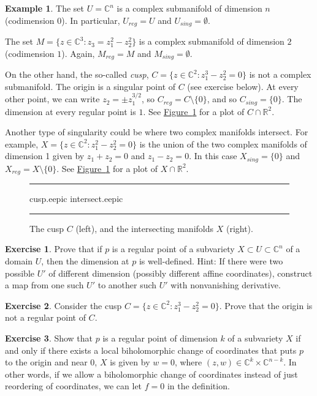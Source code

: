 \documentclass[12pt,openany]{book}
\newcommand{\C}{{\mathbb{C}}}
\newcommand{\R}{{\mathbb{R}}}
\newcommand{\myindex}[1]{#1\index{#1}}
\theoremstyle{plain}
\theoremstyle{remark}
\theoremstyle{definition}
\newenvironment{exbox}{%
    \def\FrameCommand{\vrule width 1pt \relax\hspace{10pt}}%
    \MakeFramed{\advance\hsize-\width\FrameRestore}%
}{%
    \endMakeFramed
}
\newenvironment{myfig}{%
\begin{figure}[h!t]
\noindent\rule{\textwidth}{0.5pt}\vspace{12pt}\par\centering}%
{\par\noindent\rule{\textwidth}{0.5pt}
\end{figure}}
\theoremstyle{exercise}
\newtheorem{exercise}{Exercise}[section]
\theoremstyle{example}
\newtheorem{example}[thm]{Example}
\newcommand{\figureref}[1]{\hyperref[#1]{Figure~\ref*{#1}}}
\begin{document}
\begin{example}
The set $U = \C^n$ is a complex submanifold of dimension $n$
(codimension $0$).
In particular, $U_{\mathit{reg}} = U$ and $U_{\mathit{sing}} = \emptyset$.

The set $M = \bigl\{ z \in \C^3 : z_3 = z_1^2 - z_2^2 \bigr\}$ is a complex submanifold of
dimension $2$ (codimension $1$).  Again,
$M_{\mathit{reg}} = M$ and $M_{\mathit{sing}} = \emptyset$.

On the other hand, the so-called \emph{\myindex{cusp}},
$C = \bigl\{ z \in \C^2 : z_1^3-z_2^2 = 0 \bigr\}$ is not a complex
submanifold.  The origin is a singular point of $C$
(see exercise below).
At every other point, we can write $z_2 = \pm z_1^{3/2}$,
so $C_{\mathit{reg}} = C \setminus \{0\}$, and so $C_{\mathit{sing}} = \{ 0
\}$.
The dimension at every regular point is $1$.
See \figureref{fig:cuspintersect} for a
plot of $C \cap \R^2$.

Another type of singularity could be where two complex manifolds
intersect.  For example, $X = \{ z \in \C^2 : z_1^2-z_2^2 = 0 \}$
is the union of the two complex manifolds of dimension 1 given by $z_1+z_2=0$ and
$z_1-z_2=0$.  In this case $X_{\mathit{sing}} = \{ 0 \}$ and
$X_{\mathit{reg}} = X \setminus \{ 0 \}$.
See \figureref{fig:cuspintersect} for a
plot of $X \cap \R^2$.

\begin{myfig}
\medskip
{cusp.eepic}
\qquad
\qquad
{intersect.eepic}
\bigskip
\caption{The cusp $C$ (left), and the intersecting manifolds $X$
(right).\label{fig:cuspintersect}}
\end{myfig}
\end{example}


\begin{exbox}
\begin{exercise} \label{exercise:regdimwelldef}
Prove that if $p$ is a regular point of a subvariety $X \subset U \subset
\C^n$ of a domain $U$, then the dimension at $p$ is well-defined.  Hint: If there were two possible
$U'$ of different dimension (possibly different affine coordinates), construct a map
from one such $U'$ to another such $U'$ with nonvanishing derivative.
\end{exercise}

\begin{exercise}
Consider the cusp
$C = \bigl\{ z \in \C^2 : z_1^3-z_2^2 = 0 \bigr\}$.  Prove that
the origin is not a regular point of $C$.
\end{exercise}

\begin{exercise} \label{exercise:regularbiholomorphic}
Show that $p$ is a regular point of dimension $k$ of a subvariety $X$
if and only if there
exists a local biholomorphic change of coordinates that puts $p$ to the
origin and near $0$, $X$ is given by $w=0$, where $(z,w) \in \C^{k} \times
\C^{n-k}$.  In other words, if we allow a biholomorphic change of
coordinates instead of just reordering of coordinates,
we can let $f=0$ in the definition.
\end{exercise}
\end{exbox}
\end{document}
